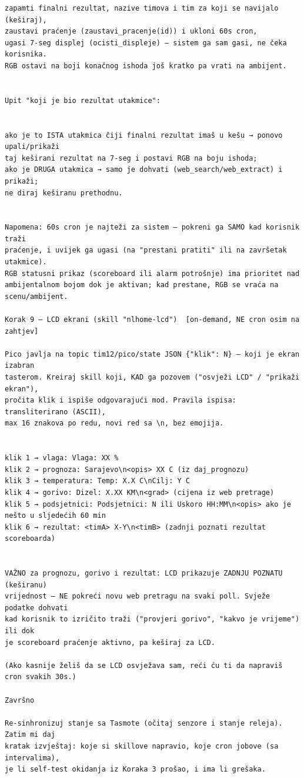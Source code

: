 \documentclass[11pt,a4paper]{article}
\begin{document}
\begin{lstlisting}[style=plain,caption={Inicijalni (konfiguracijski) prompt NLHome agenta},captionpos=b]
zapamti finalni rezultat, nazive timova i tim za koji se navijalo (keširaj),
zaustavi praćenje (zaustavi_pracenje(id)) i ukloni 60s cron,
ugasi 7-seg displej (ocisti_displeje) — sistem ga sam gasi, ne čeka korisnika.
RGB ostavi na boji konačnog ishoda još kratko pa vrati na ambijent.


Upit "koji je bio rezultat utakmice":


ako je to ISTA utakmica čiji finalni rezultat imaš u kešu → ponovo upali/prikaži
taj keširani rezultat na 7-seg i postavi RGB na boju ishoda;
ako je DRUGA utakmica → samo je dohvati (web_search/web_extract) i prikaži;
ne diraj keširanu prethodnu.


Napomena: 60s cron je najteži za sistem — pokreni ga SAMO kad korisnik traži
praćenje, i uvijek ga ugasi (na "prestani pratiti" ili na završetak utakmice).
RGB statusni prikaz (scoreboard ili alarm potrošnje) ima prioritet nad
ambijentalnom bojom dok je aktivan; kad prestane, RGB se vraća na scenu/ambijent.

Korak 9 — LCD ekrani (skill "nlhome-lcd")  [on-demand, NE cron osim na zahtjev]

Pico javlja na topic tim12/pico/state JSON {"klik": N} — koji je ekran izabran
tasterom. Kreiraj skill koji, KAD ga pozovem ("osvježi LCD" / "prikaži ekran"),
pročita klik i ispiše odgovarajući mod. Pravila ispisa: transliterirano (ASCII),
max 16 znakova po redu, novi red sa \n, bez emojija.


klik 1 → vlaga: Vlaga: XX %
klik 2 → prognoza: Sarajevo\n<opis> XX C (iz daj_prognozu)
klik 3 → temperatura: Temp: X.X C\nCilj: Y C
klik 4 → gorivo: Dizel: X.XX KM\n<grad> (cijena iz web pretrage)
klik 5 → podsjetnici: Podsjetnici: N ili Uskoro HH:MM\n<opis> ako je nešto u sljedećih 60 min
klik 6 → rezultat: <timA> X-Y\n<timB> (zadnji poznati rezultat scoreboarda)


VAŽNO za prognozu, gorivo i rezultat: LCD prikazuje ZADNJU POZNATU (keširanu)
vrijednost — NE pokreći novu web pretragu na svaki poll. Svježe podatke dohvati
kad korisnik to izričito traži ("provjeri gorivo", "kakvo je vrijeme") ili dok
je scoreboard praćenje aktivno, pa keširaj za LCD.

(Ako kasnije želiš da se LCD osvježava sam, reći ću ti da napraviš cron svakih 30s.)

Završno

Re-sinhronizuj stanje sa Tasmote (očitaj senzore i stanje releja). Zatim mi daj
kratak izvještaj: koje si skillove napravio, koje cron jobove (sa intervalima),
je li self-test okidanja iz Koraka 3 prošao, i ima li grešaka.
\end{lstlisting}
\end{document}
